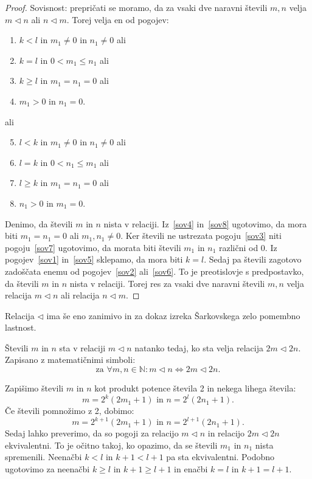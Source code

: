 \documentclass[mat2]{fmfdelo}
\newcommand{\N}{\mathbb N}
\begin{document}
\begin{proof}
Sovisnost: prepričati se moramo, da za vsaki dve naravni števili $m, n$ velja $m \triangleleft n$ ali $n \triangleleft m$. Torej velja en od pogojev:
\begin{enumerate}[label={(\roman*)}]
\item $k<l$ in $m_1 \neq 0$ in $n_1 \neq 0$ ali \label{sov1}
\item $k=l$ in $0<m_1 \leq n_1$ ali \label{sov2}
\item $k \geq l$ in $m_1 = n_1=0$ ali \label{sov3}
\item $m_1>0$ in $n_1 =0$. \label{sov4}
\end{enumerate}
ali 
\begin{enumerate}[label={(\roman*)}]
\setcounter{enumi}{4}
\item $l<k$ in $m_1 \neq 0$ in $n_1 \neq 0$ ali \label{sov5}
\item $l=k$ in $0<n_1 \leq m_1$ ali \label{sov6}
\item $l \geq k$ in $m_1 = n_1=0$ ali \label{sov7}
\item $n_1>0$ in $m_1 =0$. \label{sov8}
\end{enumerate}
Denimo, da števili $m$ in $n$ nista v relaciji. Iz~\ref{sov4} in~\ref{sov8} ugotovimo, da mora biti $m_1 = n_1 = 0$ ali $m_1, n_1 \neq 0$. Ker števili ne ustrezata pogoju~\ref{sov3} niti pogoju~\ref{sov7} ugotovimo, da morata biti števili $m_1$ in $n_1$ različni od 0. Iz pogojev~\ref{sov1} in~\ref{sov5} sklepamo, da mora biti $k=l$. Sedaj pa števili zagotovo zadoščata enemu od pogojev~\ref{sov2} ali~\ref{sov6}. To je preotislovje s predpostavko, da števili $m$ in $n$ nista v relaciji. Torej res za vsaki dve naravni števili $m, n$ velja relacija $m \triangleleft n$ ali relacija $n \triangleleft m$. 
\end{proof}

Relacija $\triangleleft$ ima še eno zanimivo in za dokaz izreka Šarkovskega zelo pomembno lastnost.
\begin{trditev}
Števili $m$ in $n$ sta v relaciji $m \triangleleft n$ natanko tedaj, ko sta velja relacija $2m \triangleleft 2n$. Zapisano z matematičnimi simboli:
$$\text{za } \forall m, n \in \N: m \triangleleft n \Leftrightarrow 2m \triangleleft 2n.$$
\end{trditev}
\begin{dokaz}
Zapišimo števili $m$ in $n$ kot produkt potence števila 2 in nekega lihega števila:
$$m= 2^k(2m_1 +1)\text{ in } n= 2^l(2n_1 +1).$$
Če števili pomnožimo z 2, dobimo:
$$m= 2^{k+1}(2m_1 +1)\text{ in } n= 2^{l+1}(2n_1 +1).$$
Sedaj lahko preverimo, da so pogoji za relacijo $m \triangleleft n$ in relacijo $2m \triangleleft 2n$ ekvivalentni. To je očitno takoj, ko opazimo, da se števili $m_1$ in $n_1$ nista spremenili. Neenačbi $k<l$ in $k+1<l+1$ pa sta ekvivalentni. Podobno ugotovimo za neenačbi $k \geq l$ in $k+1 \geq l+1$ in enačbi $k=l$ in $k+1 = l+1$.
\end{dokaz}
\end{document}
